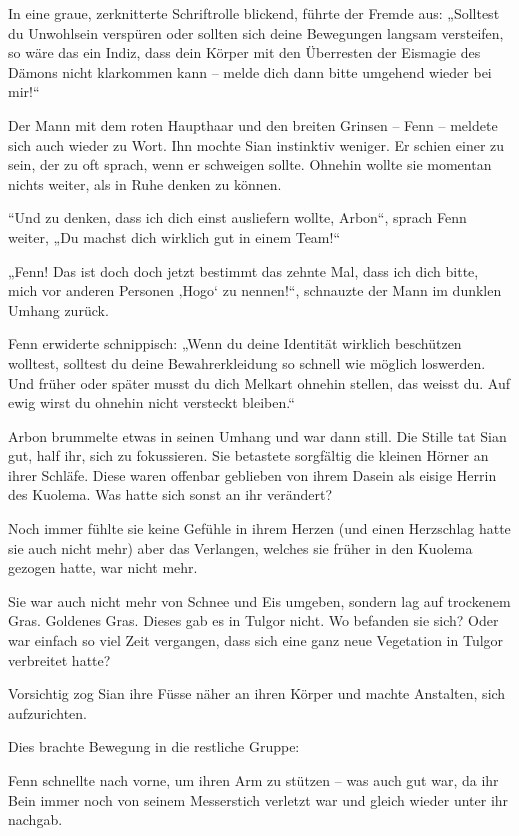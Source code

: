 \documentclass[10pt, a4paper, oneside]{book}
\begin{document}
In eine graue, zerknitterte Schriftrolle blickend, führte der Fremde aus: „Solltest du Unwohlsein verspüren oder sollten sich deine Bewegungen langsam versteifen, so wäre das ein Indiz, dass dein Körper mit den Überresten der Eismagie des Dämons nicht klarkommen kann – melde dich dann bitte umgehend wieder bei mir!“

Der Mann mit dem roten Haupthaar und den breiten Grinsen – Fenn – meldete sich auch wieder zu Wort. Ihn mochte Sian instinktiv weniger. Er schien einer zu sein, der zu oft sprach, wenn er schweigen sollte. Ohnehin wollte sie momentan nichts weiter, als in Ruhe denken zu können.

“Und zu denken, dass ich dich einst ausliefern wollte, Arbon“, sprach Fenn weiter, „Du machst dich wirklich gut in einem Team!“ 

„Fenn! Das ist doch doch jetzt bestimmt das zehnte Mal, dass ich dich bitte, mich vor anderen Personen ‚Hogo‘ zu nennen!“, schnauzte der Mann im dunklen Umhang zurück. 

Fenn erwiderte schnippisch: „Wenn du deine Identität wirklich beschützen wolltest, solltest du deine Bewahrerkleidung so schnell wie möglich loswerden. Und früher oder später musst du dich Melkart ohnehin stellen, das weisst du. Auf ewig wirst du ohnehin nicht versteckt bleiben.“

Arbon brummelte etwas in seinen Umhang und war dann still. Die Stille tat Sian gut, half ihr, sich zu fokussieren. Sie betastete sorgfältig die kleinen Hörner an ihrer Schläfe. Diese waren offenbar geblieben von ihrem Dasein als eisige Herrin des Kuolema. Was hatte sich sonst an ihr verändert? 

Noch immer fühlte sie keine Gefühle in ihrem Herzen (und einen Herzschlag hatte sie auch nicht mehr) aber das Verlangen, welches sie früher in den Kuolema gezogen hatte, war nicht mehr. 

Sie war auch nicht mehr von Schnee und Eis umgeben, sondern lag auf trockenem Gras. Goldenes Gras. Dieses gab es in Tulgor nicht. Wo befanden sie sich? Oder war einfach so viel Zeit vergangen, dass sich eine ganz neue Vegetation in Tulgor verbreitet hatte?

Vorsichtig zog Sian ihre Füsse näher an ihren Körper und machte Anstalten, sich aufzurichten.

Dies brachte Bewegung in die restliche Gruppe: 

Fenn schnellte nach vorne, um ihren Arm zu stützen – was auch gut war, da ihr Bein immer noch von seinem Messerstich verletzt war und gleich wieder unter ihr nachgab. 
\end{document}
